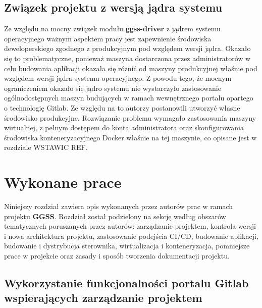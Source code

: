 \section{Związek projektu z wersją jądra systemu}
Ze względu na mocny związek modułu \textbf{ggss-driver} z jądrem systemu operacyjnego ważnym aspektem pracy jest zapewnienie środowiska deweloperskiego zgodnego z produkcyjnym pod względem wersji jądra. Okazało się to problematyczne, ponieważ maszyna dostarczona przez administratorów w celu budowania aplikacji okazała się różnić od maszyny produkcyjnej właśnie pod względem wersji jądra systemu operacyjnego. Z powodu tego, że mocnym ograniczeniem okazało się jądro systemu nie wystarczyło zastosowanie ogólnodostępnych maszyn budujących w ramach wewnętrznego portalu opartego o technologię Gitlab. Ze względu na to autorzy postanowili utworzyć własne środowisko produkcyjne. Rozwiązanie problemu wymagało zastosowania maszyny wirtualnej, z pełnym dostępem do konta administratora oraz skonfigurowania środowiska konteneryzacyjnego Docker właśnie na tej maszynie, co opisane jest w rozdziale WSTAWIC REF.



\chapter{Wykonane prace}
\label{cha:prace}

Niniejszy rozdział zawiera opis wykonanych przez autorów prac w ramach projektu \textbf{GGSS}. Rozdział został podzielony na sekcję według obszarów tematycznych poruszanych przez autorów: zarządzanie projektem, kontrola wersji i nowa architektura projektu, zastosowanie podejścia CI/CD, budowanie aplikacji, budowanie i dystrybucja sterownika, wirtualizacja i konteneryzacja, pomniejsze prace w projekcie oraz zasady i sposób tworzenia dokumentacji projektu.

\section{Wykorzystanie funkcjonalności portalu Gitlab wspierających zarządzanie projektem}

